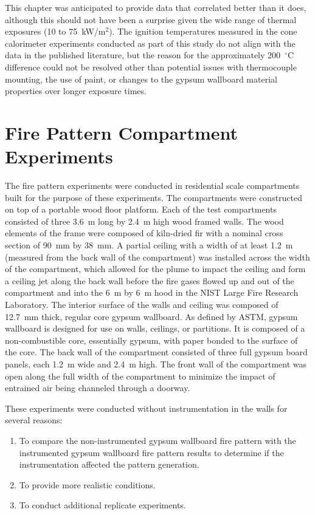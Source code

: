 \documentclass[twoside]{uocthesis}
\begin{document}
{This chapter was anticipated to provide data that correlated better than it does, although this should not have been a surprise given the wide range of thermal exposures (10 to 75~kW/m$^2$).  The ignition temperatures measured in the cone calorimeter experiments conducted as part of this study do not align with the data in the published literature, but the reason for the approximately 200~$^{\circ}$C difference could not be resolved other than potential issues with thermocouple mounting, the use of paint, or changes to the gypsum wallboard material properties over longer exposure times.       

\chapter{Fire Pattern Compartment Experiments}

The fire pattern experiments were conducted in residential scale compartments built for the purpose of these experiments.  The compartments were constructed on top of a portable wood floor platform.  Each of the test compartments consisted of three 3.6~m long by 2.4~m high wood framed walls. The wood elements of the frame were composed of kiln-dried fir with a nominal cross section of 90~mm by 38~mm.  A partial ceiling with a width of at least 1.2~m (measured from the back wall of the compartment) was installed across the width of the compartment, which allowed for the plume to impact the ceiling and form a ceiling jet along the back wall before the fire gases flowed up and out of the compartment and into the 6~m by 6~m hood in the NIST Large Fire Research Laboratory. The interior surface of the walls and ceiling was composed of 12.7~mm thick, regular core gypsum wallboard. As defined by ASTM, gypsum wallboard is designed for use on walls, ceilings, or partitions.  It is composed of a non-combustible core, essentially gypsum, with paper bonded to the surface of the core. The back wall of the compartment consisted of three full gypsum board panels, each 1.2~m wide and 2.4~m high.  The front wall of the compartment was open along the full width of the compartment to minimize the impact of entrained air being channeled through a doorway. 

These experiments were conducted without instrumentation in the walls for several reasons:
\begin{enumerate}
\item To compare the non-instrumented gypsum wallboard fire pattern with the instrumented gypsum wallboard fire pattern results to determine if the instrumentation affected the pattern generation.
\item To provide more realistic conditions.
\item To conduct additional replicate experiments.
\end{enumerate}

}
\end{document}
